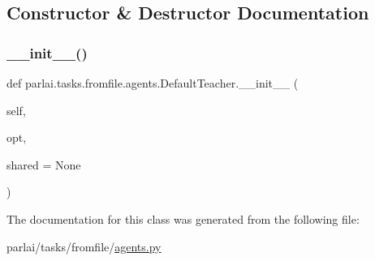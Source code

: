 \subsection{Constructor \& Destructor Documentation}
\mbox{\label{classparlai_1_1tasks_1_1fromfile_1_1agents_1_1DefaultTeacher_a4193d0c62cc2b0a602b6b53cf34e43f1}} 
\subsubsection{\texorpdfstring{\+\_\+\+\_\+init\+\_\+\+\_\+()}{\_\_init\_\_()}}
{\footnotesize\ttfamily def parlai.\+tasks.\+fromfile.\+agents.\+Default\+Teacher.\+\_\+\+\_\+init\+\_\+\+\_\+ (\begin{DoxyParamCaption}\item[{}]{self,  }\item[{}]{opt,  }\item[{}]{shared = {\ttfamily None} }\end{DoxyParamCaption})}



The documentation for this class was generated from the following file\+:\begin{DoxyCompactItemize}
\item 
parlai/tasks/fromfile/\hyperlink{parlai_2tasks_2fromfile_2agents_8py}{agents.\+py}\end{DoxyCompactItemize}
